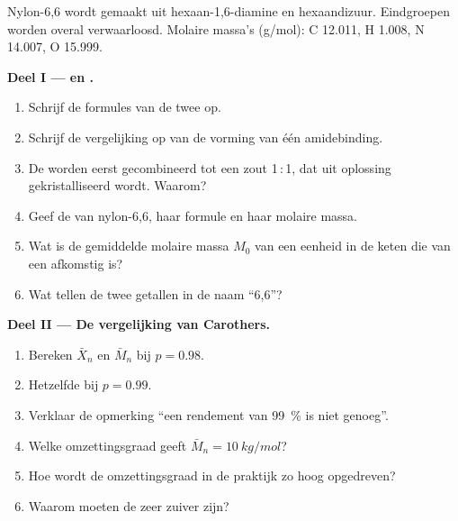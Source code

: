 \begin{problem}
\label{pb:b2:polymer-synthesis:1}
Nylon-6,6 wordt gemaakt uit hexaan-1,6-diamine en hexaandizuur. Eindgroepen worden overal verwaarloosd.
Molaire massa's (\unit{g/mol}): C 12.011, H 1.008, N 14.007, O 15.999.

\medskip
\noindent\textbf{Deel I ---  en .}
\begin{enumerate}
  \item Schrijf de formules van de twee  op.
  \item Schrijf de vergelijking op van de vorming van één amidebinding.
  \item De  worden eerst gecombineerd tot een zout 1\,:\,1, dat uit oplossing gekristalliseerd wordt. Waarom?
  \item Geef de  van nylon-6,6, haar formule en haar molaire massa.
  \item Wat is de gemiddelde molaire massa $M_0$ van een eenheid in de keten die van een  afkomstig is?
  \item Wat tellen de twee getallen in de naam ``6,6''?
\end{enumerate}

\medskip
\noindent\textbf{Deel II --- De vergelijking van Carothers.}
\begin{enumerate}[resume]
  \item Bereken $\bar X_n$ en $\bar M_n$ bij $p = 0.98$.
  \item Hetzelfde bij $p = 0.99$.
  \item Verklaar de opmerking ``een rendement van 99~\% is niet genoeg''.
  \item Welke omzettingsgraad geeft $\bar M_n = \qty{10}{kg/mol}$?
  \item Hoe wordt de omzettingsgraad in de praktijk zo hoog opgedreven?
  \item Waarom moeten de  zeer zuiver zijn?
\end{enumerate}


\end{problem}
